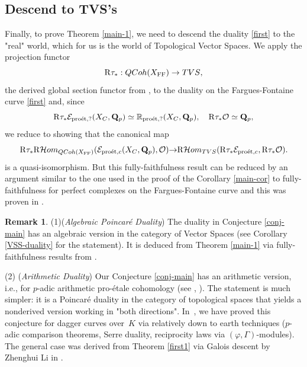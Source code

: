 \documentclass[10pt,reqno]{amsart}
\let\cal\mathcal
\theoremstyle{definition}
\newtheorem{remark}[equation]{Remark}
\theoremstyle{remark}
\def\phi{\varphi}
\newcommand{\proeet}{\operatorname{pro\acute{e}t} }
\newcommand{\Hhom}{{\cal Hom}}
\newcommand{\FF}{\operatorname{FF} }
\newcommand{\so}{{\mathcal O}}
\newcommand{\se}{{\mathcal{E}}}
\numberwithin{equation}{section}
\def\R{{\mathrm R}}
\def\Q{{\bf Q}} \def\Z{{\bf Z}}
\def\rtau{${\rm R}\tau_*$, ${\rm R}\tau'_*$, ${\rm R}\eta_*$, ${\rm R}\pi_*$}
\numberwithin{equation}{section}
\begin{document}
\subsection{Descend to {\rm TVS}'s}
Finally, to prove Theorem \ref{main-1},  we need to  descend the duality \eqref{first} to the "real" world, which for us is the world of Topological Vector Spaces. 
We apply the projection \index{rtau@\rtau}functor $$\R\tau_*: {\rm QCoh}(X_{\FF})\to {\rm TVS},$$ the derived global section functor from \cite{TVS},  to the duality on the Fargues-Fontaine curve \eqref{first}  and, since
$$
\R\tau_*\se_{\proeet,?}(X_C,\Q_p)\simeq {\mathbb R}_{\proeet,?}(X_C,\Q_p),\quad \R\tau_*\so\simeq\Q_p,
$$
we reduce to showing that the canonical map
$$
\R\tau_*\R\Hhom_{\rm QCoh(X_{\FF})}(\se_{\proeet,c}(X_C,\Q_p),\so) {\to}\R\Hhom_{\rm TVS}(\R\tau_*\se_{\proeet,c},\R\tau_*\so).
$$
is a quasi-isomorphism. 
But this  fully-faithfulness result can be reduced by an argument similar to the one used in the proof of the Corollary \ref{main-cor} to fully-faithfulness for perfect complexes on the Fargues-Fontaine curve and this was proven in \cite{TVS}. 
\begin{remark} \label{rks}(1)({\em Algebraic Poincar\'e Duality}) The duality in Conjecture \eqref{conj-main} has an algebraic version in the category of Vector Spaces (see Corollary \ref{VSS-duality} for the statement). It is deduced from Theorem \ref{main-1}  via fully-faithfulness results from \cite{TVS}. \vskip2mm

 (2)  ({\em Arithmetic Duality})  Our Conjecture \ref{conj-main} has an arithmetic version, i.e.,  for 
$p$-adic arithmetic pro-\'etale cohomology (see \cite{COB}, \cite{CGN}). The statement is  much simpler: it is a  Poincar\'e duality in the category of topological spaces that yields a nonderived version working in "both directions". 
In~\cite[Th. 1.1]{CGN}, we have proved this conjecture for dagger curves over~$K$ via relatively down to earth techniques ($p$-adic comparison theorems, Serre duality, reciprocity laws via $(\phi, \Gamma)$-modules). The general case was derived from Theorem \ref{first1} via Galois descent by Zhenghui Li in \cite{ZL}. 
 \end{remark}
\end{document}
